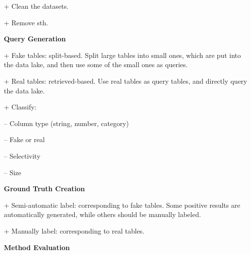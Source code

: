 + Clean the datasets.

+ Remove sth.



\noindent\textbf{Query Generation}

+ Fake tables: split-based. Split large tables into small ones, which are put into the data lake, and then use some of the small ones as queries.

+ Real tables: retrieved-based. Use real tables as query tables, and directly query the data lake.


+ Classify: 

\quad\quad -- Column type (string, number, category)
 
\quad\quad -- Fake or real
  
\quad\quad -- Selectivity

\quad\quad -- Size

\noindent\textbf{Ground Truth Creation}

+ Semi-automatic label: corresponding to fake tables. Some positive results are automatically generated, while others should be manually labeled.

+ Manually label: corresponding to real tables.

\noindent\textbf{Method Evaluation} 



